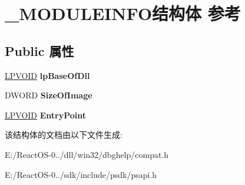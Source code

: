 \hypertarget{struct___m_o_d_u_l_e_i_n_f_o}{}\section{\+\_\+\+M\+O\+D\+U\+L\+E\+I\+N\+F\+O结构体 参考}
\label{struct___m_o_d_u_l_e_i_n_f_o}
\subsection*{Public 属性}
\begin{DoxyCompactItemize}
\item 
\mbox{\label{struct___m_o_d_u_l_e_i_n_f_o_a6459e4ef460c54f4ce3cca8c2d80fabe}} 
\hyperlink{interfacevoid}{L\+P\+V\+O\+ID} {\bfseries lp\+Base\+Of\+Dll}
\item 
\mbox{\label{struct___m_o_d_u_l_e_i_n_f_o_a38da225d6e862aa63656bccfc84f2ab9}} 
D\+W\+O\+RD {\bfseries Size\+Of\+Image}
\item 
\mbox{\label{struct___m_o_d_u_l_e_i_n_f_o_ab6b672f88892c4f11775bcee05810ed1}} 
\hyperlink{interfacevoid}{L\+P\+V\+O\+ID} {\bfseries Entry\+Point}
\end{DoxyCompactItemize}


该结构体的文档由以下文件生成\+:\begin{DoxyCompactItemize}
\item 
E\+:/\+React\+O\+S-\/0../dll/win32/dbghelp/compat.\+h\item 
E\+:/\+React\+O\+S-\/0../sdk/include/psdk/psapi.\+h\end{DoxyCompactItemize}
